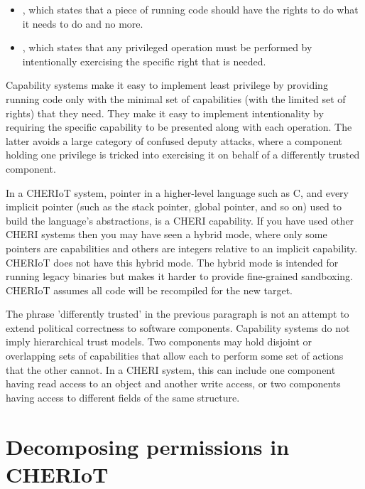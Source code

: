 \begin{itemize}
	\item{, which states that a piece of running code should have the rights to do what it needs to do and no more.}
	\item{, which states that any privileged operation must be performed by intentionally exercising the specific right that is needed.}
\end{itemize}

Capability systems make it easy to implement least privilege by providing running code only with the minimal set of capabilities (with the limited set of rights) that they need.
They make it easy to implement intentionality by requiring the specific capability to be presented along with each operation.
The latter avoids a large category of confused deputy attacks, where a component holding one privilege is tricked into exercising it on behalf of a differently trusted component.

\begin{note}
	In a CHERIoT system,  pointer in a higher-level language such as C, and every implicit pointer (such as the stack pointer, global pointer, and so on) used to build the language's abstractions, is a CHERI capability.
	If you have used other CHERI systems then you may have seen a hybrid mode, where only some pointers are capabilities and others are integers relative to an implicit capability.
	CHERIoT does not have this hybrid mode.
	The hybrid mode is intended for running legacy binaries but makes it harder to provide fine-grained sandboxing.
	CHERIoT assumes all code will be recompiled for the new target.
\end{note}

The phrase 'differently trusted' in the previous paragraph is not an attempt to extend political correctness to software components.
Capability systems do not imply hierarchical trust models.
Two components may hold disjoint or overlapping sets of capabilities that allow each to perform some set of actions that the other cannot.
In a CHERI system, this can include one component having read access to an object and another write access, or two components having access to different fields of the same structure.

\section[label=permissions]{Decomposing permissions in CHERIoT}


